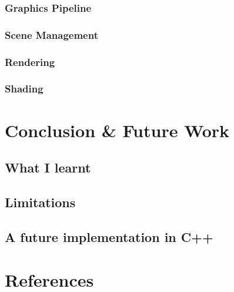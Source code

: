 \documentclass{article}
\begin{document}
\subsubsection{Graphics Pipeline}

\subsubsection{Scene Management}
\subsubsection{Rendering}
\subsubsection{Shading}

\section{Conclusion \& Future Work}

\subsection{What I learnt}

\subsection{Limitations}

\subsection{A future implementation in C++}


\section{References}
\end{document}

